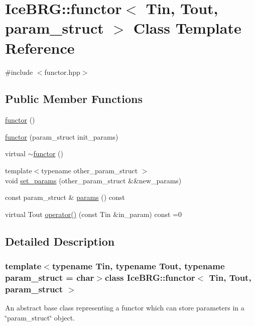 \hypertarget{classIceBRG_1_1functor}{}\section{Ice\+B\+R\+G\+:\+:functor$<$ Tin, Tout, param\+\_\+struct $>$ Class Template Reference}
\label{classIceBRG_1_1functor}


{\ttfamily \#include $<$functor.\+hpp$>$}

\subsection*{Public Member Functions}
\begin{DoxyCompactItemize}
\item 
\hyperlink{classIceBRG_1_1functor_a7657016f84dc413c8681c43078a6acaf}{functor} ()
\item 
\hyperlink{classIceBRG_1_1functor_ac1de0c6a2aed3cf32278e3ca5d1cfa04}{functor} (param\+\_\+struct init\+\_\+params)
\item 
virtual \hyperlink{classIceBRG_1_1functor_aa702a653f474cf9f2f7f4a7699967421}{$\sim$functor} ()
\item 
{\footnotesize template$<$typename other\+\_\+param\+\_\+struct $>$ }\\void \hyperlink{classIceBRG_1_1functor_abc4c0c3f1704d4bfefae5fce79b09bd1}{set\+\_\+params} (other\+\_\+param\+\_\+struct \&\&new\+\_\+params)
\item 
const param\+\_\+struct \& \hyperlink{classIceBRG_1_1functor_aa26e65bbcaa6403a4033de396de14597}{params} () const 
\item 
virtual Tout \hyperlink{classIceBRG_1_1functor_a299cdb8972790082a99a244a4255381b}{operator()} (const Tin \&in\+\_\+param) const  =0
\end{DoxyCompactItemize}


\subsection{Detailed Description}
\subsubsection*{template$<$typename Tin, typename Tout, typename param\+\_\+struct = char$>$class Ice\+B\+R\+G\+::functor$<$ Tin, Tout, param\+\_\+struct $>$}

An abstract base class representing a functor which can store parameters in a \char`\"{}param\+\_\+struct\char`\"{} object. 

